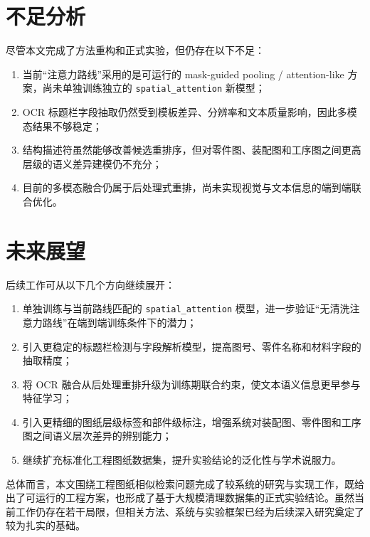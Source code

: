 \section{不足分析}

尽管本文完成了方法重构和正式实验，但仍存在以下不足：
\begin{enumerate}
  \item 当前“注意力路线”采用的是可运行的 mask-guided pooling / attention-like 方案，尚未单独训练独立的 \texttt{spatial\_attention} 新模型；
  \item OCR 标题栏字段抽取仍然受到模板差异、分辨率和文本质量影响，因此多模态结果不够稳定；
  \item 结构描述符虽然能够改善候选重排序，但对零件图、装配图和工序图之间更高层级的语义差异建模仍不充分；
  \item 目前的多模态融合仍属于后处理式重排，尚未实现视觉与文本信息的端到端联合优化。
\end{enumerate}

\section{未来展望}

后续工作可从以下几个方向继续展开：
\begin{enumerate}
  \item 单独训练与当前路线匹配的 \texttt{spatial\_attention} 模型，进一步验证“无清洗注意力路线”在端到端训练条件下的潜力；
  \item 引入更稳定的标题栏检测与字段解析模型，提高图号、零件名称和材料字段的抽取精度；
  \item 将 OCR 融合从后处理重排升级为训练期联合约束，使文本语义信息更早参与特征学习；
  \item 引入更精细的图纸层级标签和部件级标注，增强系统对装配图、零件图和工序图之间语义层次差异的辨别能力；
  \item 继续扩充标准化工程图纸数据集，提升实验结论的泛化性与学术说服力。
\end{enumerate}

总体而言，本文围绕工程图纸相似检索问题完成了较系统的研究与实现工作，既给出了可运行的工程方案，也形成了基于大规模清理数据集的正式实验结论。虽然当前工作仍存在若干局限，但相关方法、系统与实验框架已经为后续深入研究奠定了较为扎实的基础。
